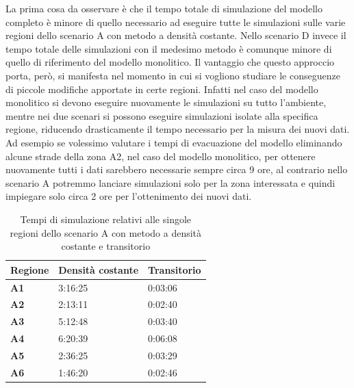 La prima cosa da osservare è che il tempo totale di simulazione del modello completo è minore di quello necessario ad eseguire tutte le simulazioni sulle varie regioni dello scenario A con metodo a densità costante. Nello scenario D invece il tempo totale delle simulazioni con il medesimo metodo è comunque minore di quello di riferimento del modello monolitico. Il vantaggio che questo approccio porta, però, si manifesta nel momento in cui si vogliono studiare le conseguenze di piccole modifiche apportate in certe regioni. Infatti nel caso del modello monolitico si devono eseguire nuovamente le simulazioni su tutto l'ambiente, mentre nei due scenari si possono eseguire simulazioni isolate alla specifica regione, riducendo drasticamente il tempo necessario per la misura dei nuovi dati. Ad esempio se volessimo valutare i tempi di evacuazione del modello eliminando alcune strade della zona A2, nel caso del modello monolitico, per ottenere nuovamente tutti i dati sarebbero necessarie sempre circa 9 ore, al contrario nello scenario A potremmo lanciare simulazioni solo per la zona interessata e quindi impiegare solo circa 2 ore per l'ottenimento dei nuovi dati.
 
\begin{table}[h]
  \centering
  \resizebox{0.7\textwidth}{!} {
  \begin{tabular}[t]{ |l|l|l| }
	\hline
	\textbf{Regione}	&		\textbf{Densità costante}	&		\textbf{Transitorio}	\\ \hline
	\textbf{A1} 		&		3:16:25					&		0:03:06			\\ \hline
	\textbf{A2}			 &		2:13:11 				&		0:02:40		\\ \hline
	\textbf{A3}			 &		5:12:48 				&		0:03:40		\\ \hline
	\textbf{A4}			 &		6:20:39 				&		0:06:08			\\ \hline
	\textbf{A5}			 &		2:36:25 				&		0:03:29		\\ \hline
	\textbf{A6}			 &		1:46:20 				&		0:02:46		\\ \hline

  \end{tabular}
  
  }
  \caption{Tempi di simulazione relativi alle singole regioni dello scenario A con metodo a densità costante e transitorio}
  \label{tab:tabella-dati-simulazioni-A}
\end{table}

